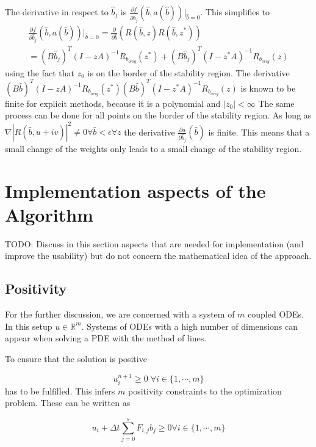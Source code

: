 \documentclass[a4paper]{scrartcl}
\numberwithin{equation}{section}
\theoremstyle{plain}
\theoremstyle{definition}
\numberwithin{theorem}{section}
\newcommand{\R}{\mathbb{R}}
\newcommand{\dt}{{\Delta t}}
\newcommand{\1}{\mathbbm{1}}
\begin{document}
The derivative in respect to $\hat{b}_j$ is 
$ \frac{\partial f}{\partial \hat{b}_j}(\hat{b},a(\hat{b})) \Big|_{\hat{b}=0}$.
This simplifies to 
\begin{multline}\label{eq:derivative_to_b}
 \frac{\partial f}{\partial \hat{b}_j}(\hat{b},a(\hat{b})) \Big|_{\hat{b}=0} = 
 \frac{\partial }{\partial \hat{b}}(R(\hat{b},z)R(\hat{b},z^*)) \\
 = (B\hat{b}_j)^T (I-zA)^{-1} R_{b_{orig}}(z^*) + (B\hat{b}_j)^T (I-z^*A)^{-1} R_{b_{orig}}(z)
\end{multline}
using the fact that $z_0$ is on the border of the stability region.
The derivative $(B\hat{b})^T (I-zA)^{-1} R_{b_{orig}}(z^*) (B\hat{b})^T (I-z^*A)^{-1} R_{b_{orig}}(z)$ is known to be finite for explicit methods, because it is a polynomial and $|z_0| < \infty$
The same process can be done for all points on the border of the stability region. 
As long as $\nabla|R(\hat{b},u+iv)|^2 \neq 0 \forall \hat{b} < \epsilon  \forall z$ the derivative $\frac{\partial a}{\partial \hat{b}_j} (\hat{b})$ is finite. This means that a small change of the weights only leads to a small change of the stability region.


\section{Implementation aspects of the Algorithm}\label{sec:imple}

TODO: Discuss in this section aspects that are needed for implementation (and improve the usability) but do not concern the mathematical idea of the approach.

\subsection{Positivity}


For the further discussion, we are concerned with a system of $m$ coupled ODEs. 
In this setup $u \in \R^m$.
Systems of ODEs with a high number of dimensions can appear when solving a PDE with the method of lines.

To ensure that the solution is positive 

\begin{equation}
 u_i^{n+1} \geq 0   \;   \forall {i \in \{1, \cdots,m \}}  
\end{equation}
has to be fulfilled.
This infers $m$ positivity constraints to the optimization problem. These can be written as

\begin{equation}
u_i + \dt \sum_{j=0}^s F_{i,j}  b_j \geq 0 \forall {i \in \{1, \cdots,m \}}  
\end{equation}
\end{document}

